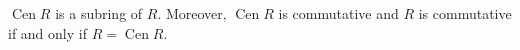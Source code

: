 $\operatorname{Cen} R$ is a subring of $R$. Moreover, $\operatorname{Cen} R$ is commutative and $R$ is commutative if and only if $R = \operatorname{Cen} R$.
